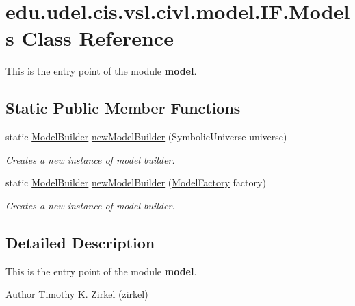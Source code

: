 \hypertarget{classedu_1_1udel_1_1cis_1_1vsl_1_1civl_1_1model_1_1IF_1_1Models}{}\section{edu.\+udel.\+cis.\+vsl.\+civl.\+model.\+I\+F.\+Models Class Reference}
\label{classedu_1_1udel_1_1cis_1_1vsl_1_1civl_1_1model_1_1IF_1_1Models}


This is the entry point of the module {\bfseries model}.  


\subsection*{Static Public Member Functions}
\begin{DoxyCompactItemize}
\item 
static \hyperlink{interfaceedu_1_1udel_1_1cis_1_1vsl_1_1civl_1_1model_1_1IF_1_1ModelBuilder}{Model\+Builder} \hyperlink{classedu_1_1udel_1_1cis_1_1vsl_1_1civl_1_1model_1_1IF_1_1Models_a9f33b841bb093dd7acb30b0ba324c19f}{new\+Model\+Builder} (Symbolic\+Universe universe)
\begin{DoxyCompactList}\small\item\em Creates a new instance of model builder. \end{DoxyCompactList}\item 
static \hyperlink{interfaceedu_1_1udel_1_1cis_1_1vsl_1_1civl_1_1model_1_1IF_1_1ModelBuilder}{Model\+Builder} \hyperlink{classedu_1_1udel_1_1cis_1_1vsl_1_1civl_1_1model_1_1IF_1_1Models_a9fc4cf34ca36aa895c418b30d3fb928f}{new\+Model\+Builder} (\hyperlink{interfaceedu_1_1udel_1_1cis_1_1vsl_1_1civl_1_1model_1_1IF_1_1ModelFactory}{Model\+Factory} factory)
\begin{DoxyCompactList}\small\item\em Creates a new instance of model builder. \end{DoxyCompactList}\end{DoxyCompactItemize}


\subsection{Detailed Description}
This is the entry point of the module {\bfseries model}. 

\begin{DoxyAuthor}{Author}
Timothy K. Zirkel (zirkel) 
\end{DoxyAuthor}


